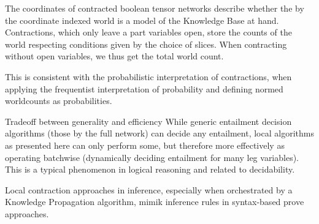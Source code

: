 
\begin{remark}
	The coordinates of contracted boolean tensor networks describe whether the by the coordinate indexed world is a model of the Knowledge Base at hand.
	Contractions, which only leave a part variables open, store the counts of the world respecting conditions given by the choice of slices.
	When contracting without open variables, we thus get the total world count.

	This is consistent with the probabilistic interpretation of contractions, when applying the frequentist interpretation of probability and defining normed worldcounts as probabilities.
\end{remark}


\begin{remark}{Tradeoff between generality and efficiency}
	While generic entailment decision algorithms (those by the full network) can decide any entailment, local algorithms as presented here can only perform some, but therefore more effectively as operating batchwise (dynamically deciding entailment for many leg variables).
	This is a typical phenomenon in logical reasoning and related to decidability.
\end{remark}

Local contraction approaches in inference, especially when orchestrated by a Knowledge Propagation algorithm, mimik inference rules in syntax-based prove approaches.
